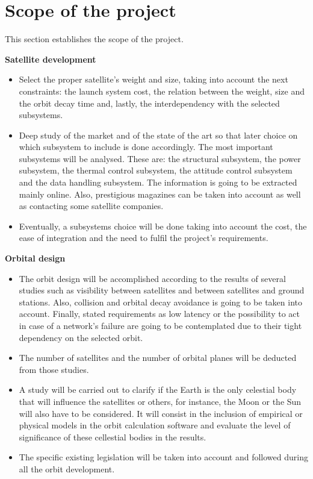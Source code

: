 \chapter{Scope of the project}
This section establishes the scope of the project.

{\bfseries Satellite development} 
\begin{itemize}
	\item Select the proper satellite’s weight and size, taking into account the next constraints: the launch system cost, the relation between the weight, size and the orbit decay time and, lastly, the interdependency with the selected subsystems.
	\item Deep study of the market and of the state of the art so that later choice on which subsystem to include is done accordingly. The most important subsystems will be analysed. These are: the structural subsystem, the power subsystem, the thermal control subsystem, the attitude control subsystem and the data handling subsystem. The information is going to be extracted mainly online. Also, prestigious magazines can be taken into account as well as contacting some satellite companies.
	\item Eventually, a subsystems choice will be done taking into account the cost, the ease of integration and the need to fulfil the project’s requirements.
\end{itemize}

{\bfseries Orbital design}

\begin{itemize}
	\item The orbit design will be accomplished according to the results of several studies such
as visibility between satellites and between satellites and ground stations. Also, collision
and orbital decay avoidance is going to be taken into account. Finally, stated requirements as low latency or the possibility to act in case of a network’s failure are going to be contemplated due to their tight dependency on the selected orbit.
	\item The number of satellites and the number of orbital planes will be deducted from those
studies.
	\item A study will be carried out to clarify if the Earth is the only celestial body that will
influence the satellites or others, for instance, the Moon or the Sun will also have to
be considered. It will consist in the inclusion of empirical or physical models in the orbit calculation software and evaluate the level of significance of these cellestial bodies in the results. 
	\item The specific existing legislation will be taken into  account and followed during all
the orbit development.

\end{itemize}


